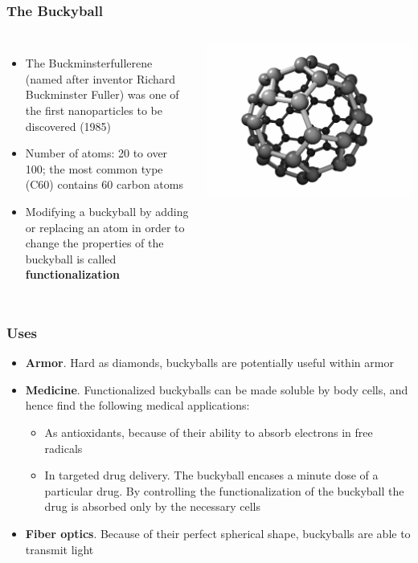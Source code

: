 \documentclass{beamer}
\begin{document}
\begin{frame}
	\frametitle{The Buckyball}
	\begin{columns}
		\begin{itemize}
			\item The Buckminsterfullerene (named after inventor Richard Buckminster Fuller) was one of the first nanoparticles to be discovered (1985)
			
			\item Number of atoms: 20 to over 100; the most common type (C60) contains 60 carbon atoms
					
			\item Modifying a buckyball by adding or replacing an atom in order to change the properties of the buckyball is called \textbf{functionalization}
		\end{itemize}
		\includegraphics[scale=.2]{buckyball_white}
	\end{columns}
\end{frame}

\begin{frame}
	\frametitle{Uses}
	\begin{itemize}
		\item \textbf{Armor}. Hard as diamonds, buckyballs are potentially useful within armor
		
		\item \textbf{Medicine}. Functionalized buckyballs can be made soluble by body cells, and hence find the following medical applications:
			\begin{itemize}
				\item As antioxidants, because of their ability to absorb electrons in free radicals
				
				\item In targeted drug delivery. The buckyball encases a minute dose of a particular drug. By controlling the functionalization of the buckyball the drug is absorbed only by the necessary cells
			\end{itemize}
		\item \textbf{Fiber optics}. Because of their perfect spherical shape, buckyballs are able to transmit light
	\end{itemize}
\end{frame}
\end{document}
